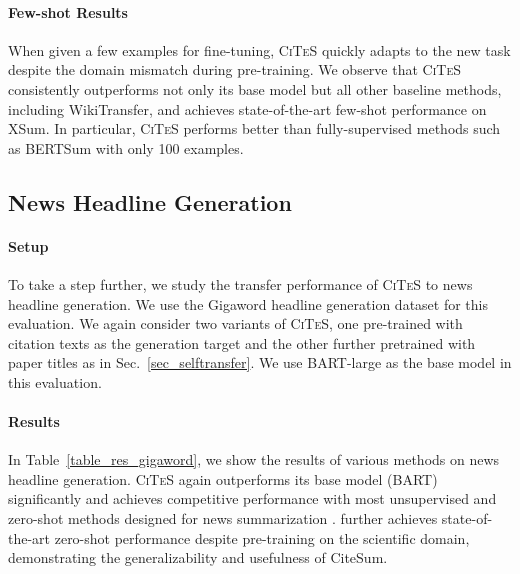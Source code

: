 \documentclass[11pt]{article}
\newcommand{\ours}{\textsc{CiTeS}\xspace}
\newcommand{\oursTitle}{\xspace}
\newcommand{\ourdata}{CiteSum\xspace}
\begin{document}
\paragraph{Few-shot Results}
When given a few examples for fine-tuning, \ours quickly adapts to the new task despite the domain mismatch during pre-training.
We observe that \ours consistently outperforms not only its base model  but all other baseline methods, including WikiTransfer, and achieves state-of-the-art few-shot performance on XSum.
In particular, \ours performs better than fully-supervised methods such as BERTSum \cite{liu-lapata-2019-text} with only 100 examples.



\subsection{News Headline Generation}
\paragraph{Setup}
To take a step further, we study the transfer performance of \ours to news headline generation.
We use the Gigaword headline generation dataset \cite{rush-etal-2015-neural} for this evaluation.
We again consider two variants of \ours, one pre-trained with citation texts as the generation target and the other further pretrained with paper titles as in Sec.~\ref{sec_selftransfer}.
We use BART-large \cite{lewis-etal-2020-bart} as the base model in this evaluation.

\paragraph{Results}
In Table~\ref{table_res_gigaword}, we show the results of various methods on news headline generation.
\ours again outperforms its base model (BART) significantly and achieves competitive performance with most unsupervised and zero-shot methods designed for news summarization \cite{zhang2020pegasus,zhu2021leveraging}.
\oursTitle further achieves state-of-the-art zero-shot performance despite pre-training on the scientific domain, demonstrating the generalizability and usefulness of \ourdata.
\end{document}
